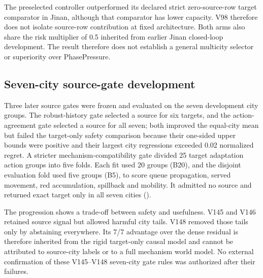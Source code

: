 The preselected controller outperformed its declared strict zero-source-row
target comparator in Jinan, although that comparator has lower capacity.
V98 therefore does not isolate source-row contribution at fixed architecture.
Both arms also share the
risk multiplier of 0.5 inherited from earlier Jinan closed-loop development.
The result therefore does not establish a general multicity selector or
superiority over PhasePressure.

\subsection{Seven-city source-gate development}
\label{sec:supp-source-gate}

Three later source gates were frozen and evaluated on the seven development
city groups.  The robust-history gate selected a source for six targets, and
the action-agreement gate selected a source for all seven; both improved the
equal-city mean but failed the target-only safety comparison because their
one-sided upper bounds were positive and their largest city regressions
exceeded 0.02 normalized regret.  A stricter mechanism-compatibility gate
divided 25 target adaptation action groups into five folds.  Each fit used 20
groups (B20), and the disjoint evaluation fold used five groups (B5), to score
queue propagation, served movement, red accumulation, spillback and mobility.
It admitted no source and returned exact target only in all seven cities
().

\begin{table}[htbp]
\caption{Frozen seven-city source-gate development.  Negative effects favour
the selected gate.  ``Upper'' is the one-sided 95\% upper bound versus the
architecture-matched target-only causal arm.  Dense denotes the pooled
H2O$^+$-style residual.  These are development results, not external
confirmation.}
\label{tab:source-gate-development}
\centering
\scriptsize
\resizebox{\textwidth}{!}{}
\end{table}

The progression shows a trade-off between safety and usefulness.  V145 and
V146 retained source signal but allowed harmful city
tails.  V148 removed those tails only by abstaining everywhere.  Its 7/7
advantage over the dense residual is therefore inherited from the rigid
target-only causal model and cannot be attributed to source-city labels or to a
full mechanism world model.  No external confirmation of these V145--V148
seven-city gate rules was authorized after their failures.

